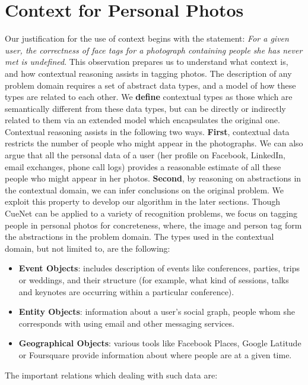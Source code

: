 \section{Context for Personal Photos}
Our justification for the use of context begins with the statement: \textit{For a given user, the correctness of face tags for a photograph containing people she has never met is undefined}. This observation prepares us to understand what context is, and how contextual reasoning assists in tagging photos. The description of any problem domain requires a set of abstract data types, and a model of how these types are related to each other. We \textbf{define} contextual types as those which are semantically different from these data types, but can be directly or indirectly related to them via an extended model which encapsulates the original one. Contextual reasoning assists in the following two ways. \textbf{First}, contextual data restricts the number of people who might appear in the photographs. We can also argue that all the personal data of a user (her profile on Facebook, LinkedIn, email exchanges, phone call logs) provides a reasonable estimate of all these people who might appear in her photos. \textbf{Second}, by reasoning on abstractions in the contextual domain, we can infer conclusions on the original problem. We exploit this property to develop our algorithm in the later sections. Though CueNet can be applied to a variety of recognition problems, we focus on tagging people in personal photos for concreteness, where, the image and person tag form the abstractions in the problem domain. The types used in the contextual domain, but not limited to, are the following:

\begin{itemize}
\item \textbf{Event Objects}: includes description of events like conferences, parties, trips or weddings, and their structure (for example, what kind of sessions, talks and keynotes are occurring within a particular conference).
\item \textbf{Entity Objects}: information about a user's social graph, people whom she corresponds with using email and other messaging services.
\item \textbf{Geographical Objects}: various tools like Facebook Places, Google Latitude or Foursquare provide information about where people are at a given time.
\end{itemize}

The important relations which dealing with such data are:

